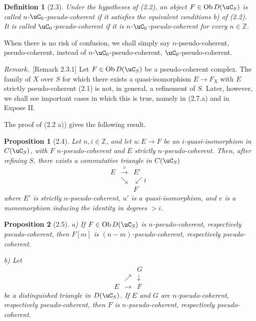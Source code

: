 \documentclass[11pt]{article}
\theoremstyle{plain}
\newtheorem*{proposition*}{Proposition}
\newtheorem*{definition*}{Definition}
\theoremstyle{definition}
\theoremstyle{remark}
\newenvironment{remarktext}{\par\medskip\noindent\textit{Remark.}\ }{\par\medskip}
\newcommand{\ZZ}{\mathbb Z}
\DeclareMathOperator{\ob}{Ob}
\begin{document}
\begin{definition*}[2.3]
Under the hypotheses of (2.2), an object $F\in\ob D(\uC_S)$ is called \emph{$n$-$\uC_0$-pseudo-coherent} if it satisfies the equivalent conditions b) of (2.2). It is called \emph{$\uC_0$-pseudo-coherent} if it is $n$-$\uC_0$-pseudo-coherent for every $n\in\ZZ$.
\end{definition*}

When there is no risk of confusion, we shall simply say $n$-pseudo-coherent, pseudo-coherent, instead of $n$-$\uC_0$-pseudo-coherent, $\uC_0$-pseudo-coherent.

\begin{remarktext}[Remark 2.3.1]
Let $F\in\ob D(\uC_S)$ be a pseudo-coherent complex. The family of $X$ over $S$ for which there exists a quasi-isomorphism $E\to F_X$ with $E$ strictly pseudo-coherent (2.1) is not, in general, a refinement of $S$. Later, however, we shall see important cases in which this is true, namely in (2.7.a) and in Expose II.
\end{remarktext}

The proof of (2.2 a)) gives the following result.

\begin{proposition*}[2.4]
Let $n,i\in\ZZ$, and let $u:E\to F$ be an $i$-quasi-isomorphism in $C(\uC_S)$, with $F$ $n$-pseudo-coherent and $E$ strictly $n$-pseudo-coherent. Then, after refining $S$, there exists a commutative triangle in $C(\uC_S)$
\[
\begin{array}{ccc}
E & \xrightarrow{v} & E'\\
& \searrow & \swarrow\wr\\
&& F
\end{array}
\]
where $E'$ is strictly $n$-pseudo-coherent, $u'$ is a quasi-isomorphism, and $v$ is a monomorphism inducing the identity in degrees $>i$.
\end{proposition*}

\begin{proposition*}[2.5]
\textup{a)} If $F\in\ob D(\uC_S)$ is $n$-pseudo-coherent, respectively pseudo-coherent, then $F[m]$ is $(n-m)$-pseudo-coherent, respectively pseudo-coherent.

\textup{b)} Let
\[
\begin{array}{ccc}
&&G\\
& \nearrow & \downarrow\\
E&\longrightarrow&F
\end{array}
\]
be a distinguished triangle in $D(\uC_S)$. If $E$ and $G$ are $n$-pseudo-coherent, respectively pseudo-coherent, then $F$ is $n$-pseudo-coherent, respectively pseudo-coherent.
\end{proposition*}
\end{document}
